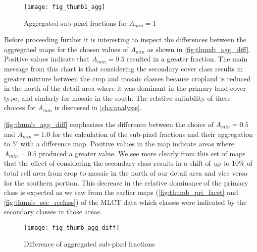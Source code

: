 \begin{figure}[hpt] 
\begin{center}
  

\texttt{[image: fig\_thumb1\_agg]}
\end{center} 
\caption{Aggregated sub-pixel fractions for $A_{min}=1$}
\label{fig:thumb1_agg}
\end{figure} 


Before proceeding further it is interesting to inspect the differences
between the aggregated maps for the chosen values of $A_{min}$ as
shown in \autoref{fig:thumb_agg_diff}.  Positive values indicate that
$A_{min} = 0.5$ resulted in a greater fraction.  The main message from
this chart is that considering the secondary cover class results in
greater mixture between the crop and mosaic classes because cropland
is reduced in the north of the detail area where it was dominant in
the primary land cover type, and simlarly for mosaic in the south.
The relative suitability of these choices for $A_{min}$ is discussed
in \autoref{cha:analysis}.



\autoref{fig:thumb_agg_diff} emphasizes the difference between the
choice of $A_{min}=0.5$ and $A_{min}=1.0$ for the calculation of the
sub-pixel fractions and their aggregation to 5$'$ with a difference
map.  Positive values in the map indicate areas where $A_{min}=0.5$
produced a greater value.  We see more clearly from this set of maps
that the effect of considering the secondary class results in a shift
of up to 10\% of total cell area from crop to mosaic in the north of
our detail area and vice versa for the southern portion.  This
decrease in the relative dominance of the primary class is expected as
we saw from the earlier maps (\autoref{fig:thumb_pri_facet} and
\autoref{fig:thumb_sec_reclass}) of the MLCT data which classes were
indicated by the secondary classes in those areas.

\begin{figure}[hpt]
\begin{center}
  

\texttt{[image: fig\_thumb\_agg\_diff]}
\end{center} 
\caption{ Difference of aggregated sub-pixel fractions}
\label{fig:thumb_agg_diff}
\end{figure} 



